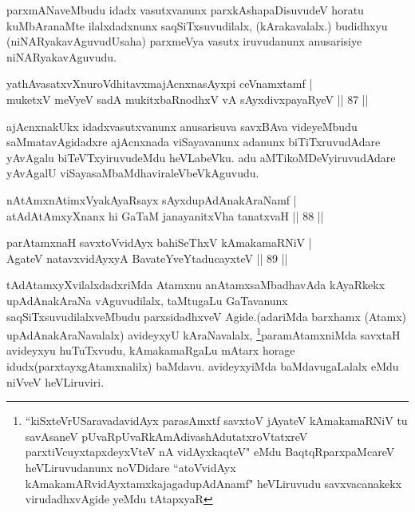 \begin{artha}
parxmANaveMbudu idadx vasutxvanunx parxkAshapaDisuvudeV horatu kuMbAranaMte ilalxdadxnunx 
saqSiTxsuvudilalx, (kArakavalalx.) budidhxyu (niNARyakavAguvudUsaha) parxmeVya vasutx 
iruvudanunx anusarisiye niNARyakavAguvudu.
\end{artha}

\begin{shl}
yathAvasatxvXnuroVdhitavxmajAcnxnasAyxpi ceVnamxtamf |\\
muketxV meVyeV sadA mukitxbaRnodhxV vA sAyxdivxpayaRyeV \hfill || 87 ||
\end{shl}

\begin{artha}
ajAcnxnakUkx idadxvasutxvanunx anusarisuva savxBAva videyeMbudu saMmatavAgidadxre ajAcnxnada viSayavanunx adanunx biTiTxruvudAdare yAvAgalu biTeVTxyiruvudeMdu heVLabeVku. adu aMTikoMDeVyiruvudAdare yAvAgalU viSayasaMbaMdhaviraleVbeVkAguvudu.
\end{artha}


\begin{shl}
nA\s \s tAmx\s nAtimxVyakAyaRsayx sAyxdupAdAnakAraNamf |\\
atAdAtAmxyXnanx hi GaTaM janayanitxVha tanatxvaH \hfill || 88 ||
\end{shl}

\begin{shl}
parAtamxnaH savxtoV\s vidAyx bahiSeThxV kAmakamaRNiV |\\
AgateV natavxvidAyxyA BavateYveYtaducayxteV \hfill || 89 ||
\end{shl}

\begin{artha}
tAdAtamxyXvilalxdadxriMda Atamxnu anAtamxsaMbadhavAda kAyaRkekx upAdAnakAraNa vAguvudilalx, taMtugaLu GaTavanunx saqSiTxsuvudilalxveMbudu parxsidadhxveV Agide.(adariMda barxhamx (Atamx) upAdAnakAraNavalalx) avideyxyU kAraNavalalx, \footnote{``kiSxteVrUSaravadavidAyx parasAmxtf savxtoV jAyateV kAmakamaRNiV tu savAsaneV pUvaRpUvaRkAmAdivashAdutatxroVtatxreV parxtiVcuyxtapxdeyxVteV nA vidAyxkaqteV" eMdu BaqtqRparxpaMcareV heVLiruvudanunx noVDidare ``atoVvidAyx kAmakamARvidAyxtamxkajagadupAdAnamf" heVLiruvudu savxvacanakekx virudadhxvAgide yeMdu tAtapxyaR}paramAtamxniMda savxtaH avideyxyu huTuTxvudu, kAmakamaRgaLu mAtarx horage idudx(parxtayxgAtamxnalilx) baMdavu. avideyxyiMda baMdavugaLalalx eMdu niVveV heVLiruviri.
\end{artha}

